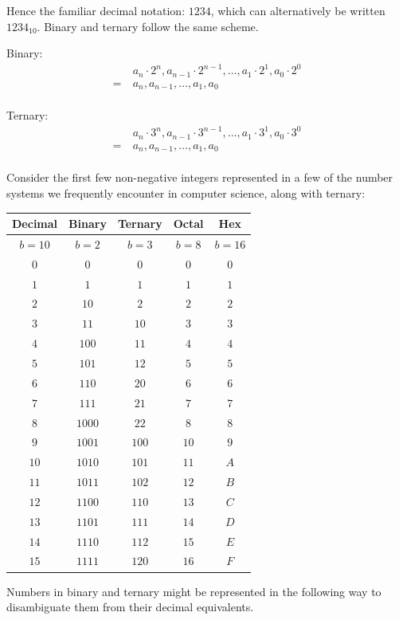 \documentclass[12pt,letterpaper,final]{report}
\begin{document}
Hence the familiar decimal notation: $1234$, which can alternatively be written $1234_{10}$. Binary and ternary follow the same scheme.

Binary:
\begin{align*}
      & a_{n} \cdot 2^{n},a_{n-1} \cdot 2^{n-1},\ldots,a_{1} \cdot 2^{1},a_{0} \cdot 2^{0} \\
  =\  & a_{n},a_{n-1},\ldots,a_{1},a_{0}                                                   \\
\end{align*}

Ternary:
\begin{align*}
      & a_{n} \cdot 3^{n},a_{n-1} \cdot 3^{n-1},\ldots,a_{1} \cdot 3^{1},a_{0} \cdot 3^{0} \\
  =\  & a_{n},a_{n-1},\ldots,a_{1},a_{0}                                                   \\
\end{align*}

Consider the first few non-negative integers represented in a few of the number systems we frequently encounter in computer science, along with ternary:

\begin{center}
  \begin{tabular}{|c|c|c|c|c|}
    \hline
    Decimal & Binary & Ternary & Octal & Hex    \\
    \hline
    $b=10$  & $b=2$  & $b=3$   & $b=8$ & $b=16$ \\
    \hline
    $0$     & $0$    & $0$     & $0$   & $0$    \\
    $1$     & $1$    & $1$     & $1$   & $1$    \\
    $2$     & $10$   & $2$     & $2$   & $2$    \\
    $3$     & $11$   & $10$    & $3$   & $3$    \\
    $4$     & $100$  & $11$    & $4$   & $4$    \\
    $5$     & $101$  & $12$    & $5$   & $5$    \\
    $6$     & $110$  & $20$    & $6$   & $6$    \\
    $7$     & $111$  & $21$    & $7$   & $7$    \\
    $8$     & $1000$ & $22$    & $8$   & $8$    \\
    $9$     & $1001$ & $100$   & $10$  & $9$    \\
    $10$    & $1010$ & $101$   & $11$  & $A$    \\
    $11$    & $1011$ & $102$   & $12$  & $B$    \\
    $12$    & $1100$ & $110$   & $13$  & $C$    \\
    $13$    & $1101$ & $111$   & $14$  & $D$    \\
    $14$    & $1110$ & $112$   & $15$  & $E$    \\
    $15$    & $1111$ & $120$   & $16$  & $F$    \\
    \hline
  \end{tabular}
\end{center}
\pagebreak
Numbers in binary and ternary might be represented in the following way to disambiguate them from their decimal equivalents.
\end{document}
